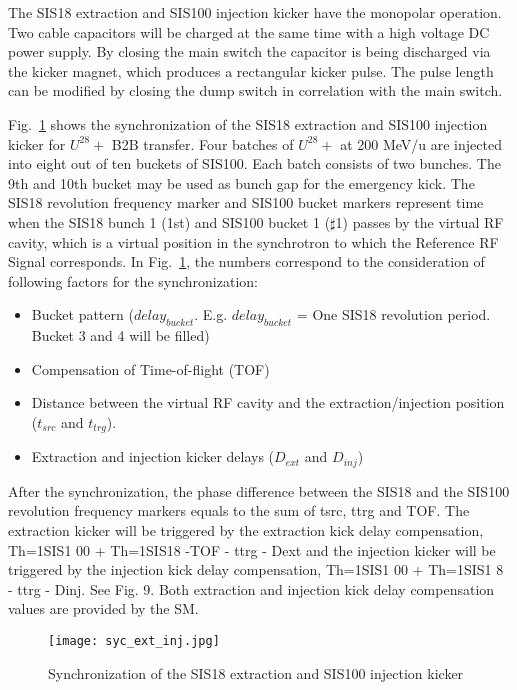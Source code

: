 The SIS18 extraction and SIS100 injection kicker have the monopolar operation. Two cable capacitors will be charged at the same time with a high voltage DC power supply. By closing the main switch the capacitor is being discharged via the kicker magnet, which produces a rectangular kicker pulse. The pulse length can be modified by closing the dump switch in correlation with the main switch. 

Fig.~\ref{syc_ext_inj} shows the synchronization of the SIS18 extraction and SIS100 injection kicker for $U^28+$ B2B transfer. Four batches of $U^28+$ at 200 MeV/u are injected into eight
out of ten buckets of SIS100. Each batch consists of two bunches. The 9th and 10th bucket may be used as bunch gap for the emergency kick. The SIS18 revolution frequency marker and SIS100 bucket markers represent time when the SIS18 bunch 1 (1st) and SIS100 bucket 1 ($\sharp$1) passes by the virtual RF cavity, which is a virtual position in the synchrotron to which the Reference RF Signal corresponds. In Fig.~\ref{syc_ext_inj}, the numbers correspond to the
consideration of following factors for the synchronization:
\begin{itemize}
\item Bucket pattern ($delay_{bucket}$. E.g. $delay_{bucket}$ = One SIS18 revolution period. Bucket 3 and 4 will be filled)
\item Compensation of Time-of-flight (TOF)
\item Distance between the virtual RF cavity and the extraction/injection position ($t_{src}$ and $t_{trg}$).
\item Extraction and injection kicker delays ($D_{ext}$ and $D_{inj}$)
\end{itemize}
After the synchronization, the phase difference between the SIS18 and the SIS100 revolution frequency markers equals to the sum of tsrc, ttrg and TOF. The extraction kicker will be triggered by the extraction kick delay compensation, Th=1SIS1 00 +
Th=1SIS18 -TOF - ttrg - Dext and the injection kicker will be triggered by the injection kick
delay compensation, Th=1SIS1 00 + Th=1SIS1 8 - ttrg - Dinj. See Fig. 9. Both extraction and
injection kick delay compensation values are provided by the SM.
 
\begin{figure}[!htb]
   \centering   
   \texttt{[image: syc\_ext\_inj.jpg]}
   \caption{Synchronization of the SIS18 extraction and SIS100 injection kicker}
   \label{syc_ext_inj}
\end{figure}


